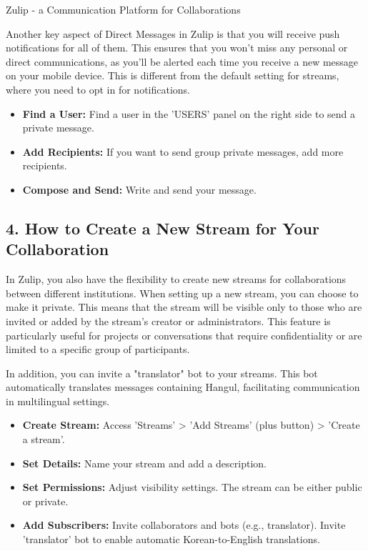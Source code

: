 \begin{coverpage}{Zulip - a Communication Platform for Collaborations}
{Another key aspect of Direct Messages in Zulip is that you will receive push notifications for all of them. This ensures that you won't miss any personal or direct communications, as you'll be alerted each time you receive a new message on your mobile device. This is different from the default setting for streams, where you need to opt in for notifications.
\begin{itemize}[leftmargin=0.5cm, rightmargin=0.5cm]
\item \textbf{Find a User:} Find a user in the 'USERS' panel on the right side to send a private message.
\item \textbf{Add Recipients:} If you want to send group private messages, add more recipients.
\item \textbf{Compose and Send:} Write and send your message.
\end{itemize}
\subsection*{4. How to Create a New Stream for Your Collaboration}
In Zulip, you also have the flexibility to create new streams for collaborations between different institutions. When setting up a new stream, you can choose to make it private. This means that the stream will be visible only to those who are invited or added by the stream's creator or administrators. This feature is particularly useful for projects or conversations that require confidentiality or are limited to a specific group of participants.

In addition, you can invite a "translator" bot to your streams. This bot automatically translates messages containing Hangul, facilitating communication in multilingual settings.
\begin{itemize}[leftmargin=0.5cm, rightmargin=0.5cm]
\item \textbf{Create Stream:} Access 'Streams' > 'Add Streams' (plus button) > 'Create a stream'.
\item \textbf{Set Details:} Name your stream and add a description.
\item \textbf{Set Permissions:} Adjust visibility settings. The stream can be either public or private.
\item \textbf{Add Subscribers:} Invite collaborators and bots (e.g., translator). Invite 'translator' bot to enable automatic Korean-to-English translations.
\end{itemize}
}
\end{coverpage}
